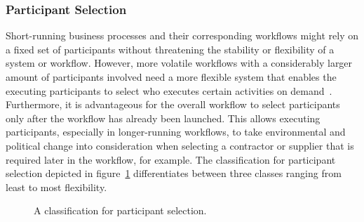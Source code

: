 \subsubsection{Participant Selection}
\label{sec:evaluation:qualitative_analysis:flexibility_criteria:participant_selection}
Short-running business processes and their corresponding workflows might rely on a fixed set of participants without threatening the stability or flexibility of a system or workflow. However, more volatile workflows with a considerably larger amount of participants involved need a more flexible system that enables the executing participants to select who executes certain activities on demand~\cite{fdhila2012_change_in_collaborative_processes}. Furthermore, it is advantageous for the overall workflow to select participants only after the workflow has already been launched. This allows executing participants, especially in longer-running workflows, to take environmental and political change into consideration when selecting a contractor or supplier that is required later in the workflow, for example. The classification for participant selection depicted in figure~\ref{fig:evaluation:qualitative_analysis:participant_selection_classes} differentiates between three classes ranging from least to most flexibility.

\begin{figure}[h]
    \caption{A classification for participant selection.}
    \label{fig:evaluation:qualitative_analysis:participant_selection_classes}
\end{figure}

